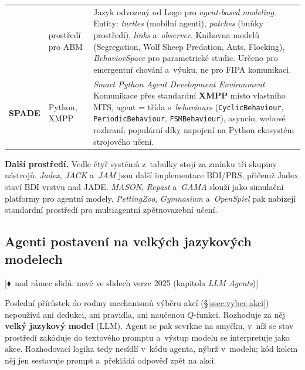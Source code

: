 \documentclass[11pt,a4paper]{article}
\theoremstyle{definition}
\newcommand{\mimoq}[1]{\textcolor{markcol}{\textsf{\footnotesize[$\blacklozenge$~nad rámec slidů: #1]}}}
\begin{document}
\begin{center}
\begin{tabular}{p{} p{} p{}}
  & prostředí pro ABM
  & Jazyk odvozený od Logo pro \emph{agent-based modeling}. Entity: \emph{turtles} (mobilní
    agenti), \emph{patches} (buňky prostředí), \emph{links} a~\emph{observer}. Knihovna modelů
    (Segregation, Wolf Sheep Predation, Ants, Flocking), \emph{BehaviorSpace} pro parametrické
    studie. Určeno pro emergentní chování a~výuku, ne pro FIPA komunikaci. \\
\textbf{SPADE}
  & Python, XMPP
  & \emph{Smart Python Agent Development Environment}. Komunikace přes standardní
    \textbf{XMPP} místo vlastního MTS, agent = třída s~\emph{behaviours}
    (\texttt{CyclicBehaviour}, \texttt{PeriodicBehaviour}, \texttt{FSMBehaviour}), asyncio,
    webové rozhraní; populární díky napojení na Python ekosystém strojového učení. \\
\bottomrule
\end{tabular}
\end{center}

\textbf{Další prostředí.} Vedle čtyř systémů z~tabulky stojí za zmínku tři skupiny nástrojů.
\emph{Jadex}, \emph{JACK} a~\emph{JAM} jsou další implementace BDI/PRS, přičemž Jadex staví
BDI vrstvu nad JADE. \emph{MASON}, \emph{Repast} a~\emph{GAMA} slouží jako simulační platformy
pro agentní modely. \emph{PettingZoo}, \emph{Gymnasium} a~\emph{OpenSpiel} pak nabízejí
standardní prostředí pro multiagentní zpětnovazební učení.

\subsection{Agenti postavení na velkých jazykových modelech}
\label{ssec:llm-agenti}

\noindent\mimoq{nově ve slidech verze 2025 (kapitola \emph{LLM Agents})}

Poslední přírůstek do rodiny mechanismů výběru akcí (\S\ref{ssec:vyber-akci}) nepoužívá ani
dedukci, ani pravidla, ani naučenou $Q$-funkci. Rozhoduje za něj \textbf{velký jazykový model}
(LLM). Agent se pak scvrkne na smyčku, v~níž se stav prostředí zakóduje do textového promptu
a~výstup modelu se interpretuje jako akce. Rozhodovací logika tedy nesídlí v~kódu agenta,
nýbrž v~modelu; kód kolem něj jen sestavuje prompt a~překládá odpověď zpět na akci.
\end{document}
